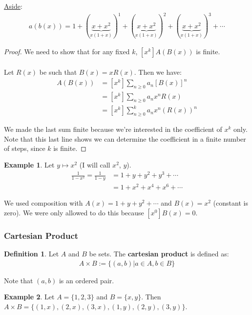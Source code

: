 \documentclass[]{article}
\theoremstyle{definition}
\newtheorem*{defn}{Definition}
\newtheorem{ex}{Example}[section]
\begin{document}
				\underline{Aside}:
				\begin{align*}
					a(b(x)) = 1 + (\underbrace{x + x^2}_{x(1+x)})^1 + (\underbrace{x + x^2}_{x(1+x)})^2 + (\underbrace{x + x^2}_{x(1+x)})^3 + \cdots
				\end{align*}

				\begin{proof}
					We need to show that for any fixed $k$, $[x^k]A(B(x))$ is finite.
					\\ \\
					Let $R(x)$ be such that $B(x) = xR(x)$. Then we have:
					\begin{align*}
						[x^k]A(B(x)) &= [x^k] \sum_{n \ge 0} a_n[B(x)]^n \\
						&= [x^k] \sum_{n \ge 0} a_n x^n R(x) \\
						&= [x^k] \sum_{n \ge 0}^{k} a_n x^n (R(x))^n
					\end{align*}

					We made the last sum finite because we're interested in the coefficient of $x^k$ only. Note that this last line shows we can determine the coefficient in a finite number of steps, since $k$ is finite.
				\end{proof}

				\begin{ex}
					Let $y \mapsto x^2$ (I will call $x^2$, $y$).
					\begin{align*}
						\frac{1}{1 - x^2} = \frac{1}{1 - y} &= 1 + y + y^2 + y^3 + \cdots \\
					&= 1 + x^2 + x^4 + x^6 + \cdots
					\end{align*}

					We used composition with $A(x) = 1 + y + y^2 + \cdots$ and $B(x) = x^2$ (constant is zero). We were only allowed to do this because $[x^0]B(x) = 0$.
				\end{ex}
			\subsubsection{Cartesian Product}
				\begin{defn}
					Let $A$ and $B$ be sets. The \textbf{cartesian product} is defined as:
					\begin{align*}
						A \times B := \{ (a, b) \big| a \in A, b \in B \}
					\end{align*}

					Note that $(a, b)$ is an ordered pair.
				\end{defn}

				\begin{ex}
					Let $A = \{1, 2, 3\}$ and $B = \{x, y\}$. Then $A \times B = \{ (1, x), (2, x), (3, x), (1, y), (2, y), (3, y) \}$.
				\end{ex}
\end{document}
